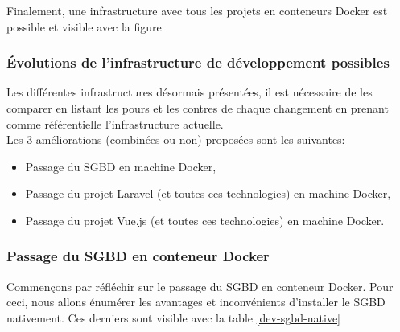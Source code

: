 \documentclass[
    iai, %
    il, %
]{heig-tb}
\begin{document}
Finalement, une infrastructure avec tous les projets en conteneurs Docker est possible et visible
avec la figure %


\clearpage

\subsubsection{Évolutions de l'infrastructure de développement possibles}
Les différentes infrastructures désormais présentées, il est nécessaire de les comparer en listant les pours et les contres de chaque changement en prenant comme référentielle l'infrastructure actuelle.\\
Les 3 améliorations (combinées ou non) proposées sont les suivantes:
\begin{itemize}
    \item Passage du SGBD en machine Docker,
    \item Passage du projet Laravel (et toutes ces technologies) en machine Docker,
    \item Passage du projet Vue.js (et toutes ces technologies) en machine Docker.
\end{itemize}

\subsubsection{Passage du SGBD en conteneur Docker}
Commençons par réfléchir sur le passage du SGBD en conteneur Docker.
Pour ceci, nous allons énumérer les avantages et inconvénients d'installer le SGBD nativement.
Ces derniers sont visible avec la table \ref{dev-sgbd-native}
\end{document}

